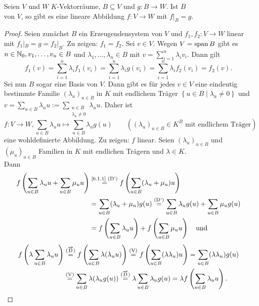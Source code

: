 \documentclass[../../main.tex]{subfiles}
\begin{document}
\begin{pro}\label{6.3.4}
Seien $V$ und $W$ $K$-Vektorräume, $B\subseteq V$ und $g:B\to W$. Ist $B$\\
 von $V$, so gibt es  eine lineare Abbildung $f:V\to W$ mit $f|_B = g$.
\end{pro}
\begin{proof}
Seien zunächst $B$ ein Erzeugendensystem von $V$ und $f_1,f_2:V\to W$ linear mit $f_1|_B = g = f_2|_B$. Zu zeigen: $f_1=f_2$. Sei $v\in V$. Wegen $V=\operatorname{span} B$ gibt es $n\in\mathbb N_0, v_1,\ldots,v_n\in B$ und $\lambda_1,\ldots,\lambda_n\in B$ mit $v=\sum_{i=1}^{n}\lambda_iv_i$. Dann gilt
$$f_1(v) = \sum_{i=1}^{n}\lambda_i f_1(v_i) = \sum_{i=1}^{n}\lambda_ig(v_i) = \sum_{i=1}^{n}\lambda_i f_2(v_i) = f_2(v).$$
Sei nun $B$ sogar eine Basis von $V$. Dann gibt es für jedes $v\in V$ eine eindeutig bestimmte Familie $(\lambda_u)_{u\in B}$ in $K$ mit endlichem Träger $\left\{u\in B\mid \lambda_u\ne 0\right\}$ und $v=\sum_{u\in B} \lambda_u u :=\sum_{\substack{u\in B\\\lambda_u\ne 0}}\lambda_u u$. Daher ist
$$f:V\to W, \sum_{u\in B}\lambda_u u\mapsto\sum_{u\in B}\lambda_u g(u)\qquad ((\lambda_u)_{u\in B}\in K^B \text{ mit endlichem Träger})$$
eine wohldefinierte Abbildung.
Zu zeigen: $f$ linear. Seien $(\lambda_u)_{u\in B}$ und $(\mu_u)_{u\in B}$ Familien in $K$ mit endlichen Trägern und $\lambda\in K$.\\
Dann 
\begin{align*}
f\left(\sum_{u\in B}\lambda_u u+\sum_{u\in B}\mu_u u\right) & \overset{\text{\ref{6.1.1} (D')}}{=} f\left(\sum_{u\in B}(\lambda_u+\mu_u)u\right)\\
& = \sum_{u\in B}(\lambda_u +\mu_u)g(u) \overset{\text{(D')}}{=} \sum_{u\in B}\lambda_u g(u) + \sum_{u\in B}\mu_u g(u)\\
& = f\left(\sum_{u\in B}\lambda_u u\right) + f\left(\sum_{u\in B}\mu_u u\right) \quad \text{und}
\end{align*}
\begin{align*}
f\left(\lambda\sum_{u\in B}\lambda_u u\right) & \overset{\text{$(\overrightarrow{\text{D}})$}}{=} f\left(\sum_{u\in B}\lambda(\lambda_u u)\right) \overset{\text{(V)}}{=} f\left(\sum_{u\in B}(\lambda\lambda_u) u\right) = \sum_{u\in B}(\lambda\lambda_u)g(u)\\
& \overset{\text{(V)}}{=}\sum_{u\in B}\lambda(\lambda_u g(u)) \overset{\text{$(\overrightarrow{\text{D}})$}}{=}\lambda\sum_{u\in B}\lambda_u g(u)=\lambda f\left(\sum_{u\in B}\lambda_u u\right).
\end{align*}
\end{proof}
\end{document}
